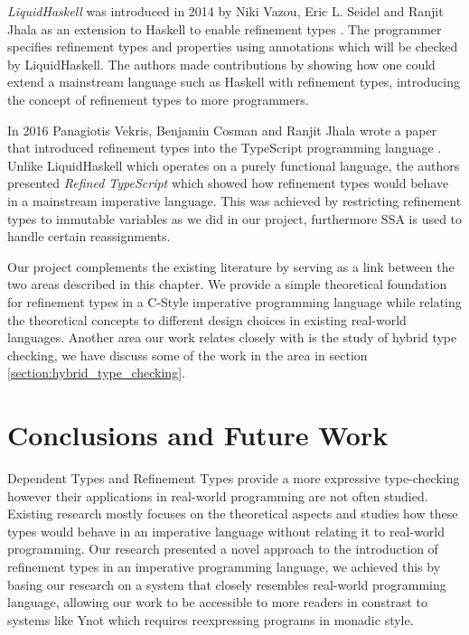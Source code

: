 \documentclass[a4paper,12pt]{report}
\begin{document}
\par
\textit{LiquidHaskell} was introduced in 2014 by Niki Vazou, Eric L. Seidel and 
Ranjit Jhala as an extension to Haskell to enable refinement types \cite{liqHaskell}. 
The programmer specifies refinement types and properties using annotations which 
will be checked by LiquidHaskell. The authors made contributions by showing how 
one could extend a mainstream language such as Haskell with refinement types, 
introducing the concept of refinement types to more programmers. 

\par
In 2016 Panagiotis Vekris, Benjamin Cosman and Ranjit Jhala wrote a paper that introduced refinement types into the TypeScript 
programming language \cite{rts}. Unlike LiquidHaskell which operates 
on a purely functional language, the authors presented \textit{Refined TypeScript} 
which showed how refinement types would behave in a mainstream imperative language. 
This was achieved by restricting refinement types to immutable variables as we 
did in our project, furthermore SSA is used to handle certain reassignments.

\par
Our project complements the existing literature by serving as a link between 
the two areas described in this chapter. We provide a simple theoretical 
foundation for refinement types in a C-Style imperative programming language 
while relating the theoretical concepts to different design choices in existing 
real-world languages. Another area our work relates closely with is the study of 
hybrid type checking, we have discuss some of the work in the area in section 
\ref{section:hybrid_type_checking}.

\chapter{Conclusions and Future Work} \label{chapter:further_work}
Dependent Types and Refinement Types provide a more expressive type-checking 
however their applications in real-world programming are not often studied. 
Existing research mostly focuses on the theoretical aspects and studies how 
these types would behave in an imperative language without relating it to 
real-world programming. Our research presented a novel approach to the 
introduction of refinement types in an imperative programming language, we 
achieved this by basing our research on a system that closely resembles 
real-world programming language, allowing our work to be accessible 
to more readers in constrast to systems like Ynot which requires reexpressing 
programs in monadic style. 
\end{document}
